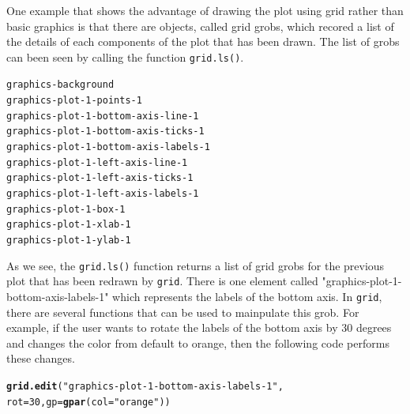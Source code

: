 \documentclass[a4paper,10pt]{article}\usepackage[]{graphicx}\usepackage[]{color}
\makeatletter
\newcommand{\hlnum}[1]{\textcolor[rgb]{0.686,0.059,0.569}{#1}}%
\newcommand{\hlstr}[1]{\textcolor[rgb]{0.192,0.494,0.8}{#1}}%
\newcommand{\hlopt}[1]{\textcolor[rgb]{0,0,0}{#1}}%
\newcommand{\hlstd}[1]{\textcolor[rgb]{0.345,0.345,0.345}{#1}}%
\newcommand{\hlkwc}[1]{\textcolor[rgb]{0.333,0.667,0.333}{#1}}%
\newcommand{\hlkwd}[1]{\textcolor[rgb]{0.737,0.353,0.396}{\textbf{#1}}}%
\newenvironment{kframe}{%
 \def\at@end@of@kframe{}%
 \ifinner\ifhmode%
  \def\at@end@of@kframe{\end{minipage}}%
  \begin{minipage}{\columnwidth}%
 \fi\fi%
 \def\FrameCommand##1{\hskip\@totalleftmargin \hskip-\fboxsep
 \colorbox{shadecolor}{##1}\hskip-\fboxsep
     \hskip-\linewidth \hskip-\@totalleftmargin \hskip\columnwidth}%
 \MakeFramed {\advance\hsize-\width
   \@totalleftmargin\z@ \linewidth\hsize
   \@setminipage}}%
 {\par\unskip\endMakeFramed%
 \at@end@of@kframe}
\newenvironment{knitrout}{}{} %
\makeatother
\begin{document}
One example that shows the advantage of drawing the plot using grid rather than basic graphics is that there are objects, called grid grobs, which recored a list of the details of each components of the plot that has been drawn. The list of grobs can been seen by calling the function \texttt{grid.ls()}. \\
\begin{knitrout}
\color{fgcolor}\begin{kframe}
\begin{alltt}
\hlstd{graphics}\hlopt{-}\hlstd{background}
\hlstd{graphics}\hlopt{-}\hlstd{plot}\hlopt{-}\hlnum{1}\hlopt{-}\hlstd{points}\hlopt{-}\hlnum{1}
\hlstd{graphics}\hlopt{-}\hlstd{plot}\hlopt{-}\hlnum{1}\hlopt{-}\hlstd{bottom}\hlopt{-}\hlstd{axis}\hlopt{-}\hlstd{line}\hlopt{-}\hlnum{1}
\hlstd{graphics}\hlopt{-}\hlstd{plot}\hlopt{-}\hlnum{1}\hlopt{-}\hlstd{bottom}\hlopt{-}\hlstd{axis}\hlopt{-}\hlstd{ticks}\hlopt{-}\hlnum{1}
\hlstd{graphics}\hlopt{-}\hlstd{plot}\hlopt{-}\hlnum{1}\hlopt{-}\hlstd{bottom}\hlopt{-}\hlstd{axis}\hlopt{-}\hlstd{labels}\hlopt{-}\hlnum{1}
\hlstd{graphics}\hlopt{-}\hlstd{plot}\hlopt{-}\hlnum{1}\hlopt{-}\hlstd{left}\hlopt{-}\hlstd{axis}\hlopt{-}\hlstd{line}\hlopt{-}\hlnum{1}
\hlstd{graphics}\hlopt{-}\hlstd{plot}\hlopt{-}\hlnum{1}\hlopt{-}\hlstd{left}\hlopt{-}\hlstd{axis}\hlopt{-}\hlstd{ticks}\hlopt{-}\hlnum{1}
\hlstd{graphics}\hlopt{-}\hlstd{plot}\hlopt{-}\hlnum{1}\hlopt{-}\hlstd{left}\hlopt{-}\hlstd{axis}\hlopt{-}\hlstd{labels}\hlopt{-}\hlnum{1}
\hlstd{graphics}\hlopt{-}\hlstd{plot}\hlopt{-}\hlnum{1}\hlopt{-}\hlstd{box}\hlopt{-}\hlnum{1}
\hlstd{graphics}\hlopt{-}\hlstd{plot}\hlopt{-}\hlnum{1}\hlopt{-}\hlstd{xlab}\hlopt{-}\hlnum{1}
\hlstd{graphics}\hlopt{-}\hlstd{plot}\hlopt{-}\hlnum{1}\hlopt{-}\hlstd{ylab}\hlopt{-}\hlnum{1}
\end{alltt}
\end{kframe}
\end{knitrout}

As we see, the \texttt{grid.ls()} function returns a list of grid grobs for the previous plot that has been redrawn by \texttt{grid}. There is one element called "graphics-plot-1-bottom-axis-labels-1" which represents the labels of the bottom axis. In \texttt{grid}, there are several functions that can be used to mainpulate this grob. For example, if the user wants to rotate the labels of the bottom axis by 30 degrees and changes the color from default to orange, then the following code performs these changes.

\begin{knitrout}
\color{fgcolor}\begin{kframe}
\begin{alltt}
\hlkwd{grid.edit}\hlstd{(}\hlstr{"graphics-plot-1-bottom-axis-labels-1"}\hlstd{,}
          \hlkwc{rot}\hlstd{=}\hlnum{30}\hlstd{,} \hlkwc{gp}\hlstd{=}\hlkwd{gpar}\hlstd{(}\hlkwc{col}\hlstd{=}\hlstr{"orange"}\hlstd{))}
\end{alltt}
\end{kframe}
\end{knitrout}
\end{document}

